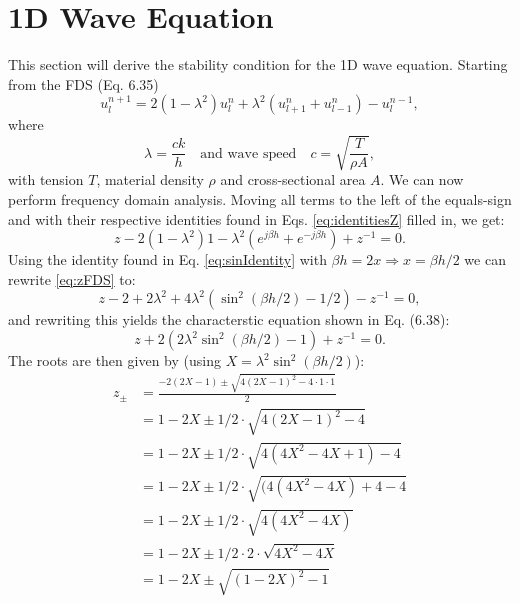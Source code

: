 \documentclass{article}
\begin{document}
\section{1D Wave Equation}
This section will derive the stability condition for the 1D wave equation. Starting from the FDS (Eq. 6.35)
\begin{equation}
    u_l^{n+1} = 2(1-\lambda^2)u_l^n + \lambda^2(u_{l+1}^n+u_{l-1}^n)-u_l^{n-1},
\end{equation}
where
\begin{equation}\label{eq:lambda}
    \lambda = \frac{ck}{h} \quad \text{and wave speed} \quad c = \sqrt{\frac{T}{\rho A}},
\end{equation}
with tension $T$, material density $\rho$ and cross-sectional area $A$.
We can now perform frequency domain analysis. Moving all terms to the left of the equals-sign and with their respective identities found in Eqs. \eqref{eq:identitiesZ} filled in, we get:
\begin{equation}\label{eq:zFDS}
    z - 2(1-\lambda^2)1 - \lambda^2(e^{j\beta h}+e^{-j\beta h}) + z^{-1} = 0.
\end{equation}
Using the identity found in Eq. \eqref{eq:sinIdentity} with $\beta h = 2x \Rightarrow x = \beta h / 2$ we can rewrite \eqref{eq:zFDS} to:
\begin{equation}
     z - 2 + 2\lambda^2 +4\lambda^2(\sin^2({\beta h / 2}) - 1/2) - z^{-1} = 0,
\end{equation}
and rewriting this yields the characterstic equation shown in Eq. (6.38):
\begin{equation}\label{eq:characteristic1D}
     z + 2(2\lambda^2\sin^2(\beta h/2) - 1) + z^{-1} = 0.
\end{equation}
The roots are then given by (using $X = \lambda^2\sin^2(\beta h/2)$):
\begin{equation}
\begin{aligned}\nonumber
    z_\pm &= \frac{-2(2X-1) \pm \sqrt{4(2X-1)^2 - 4 \cdot 1 \cdot 1}}{2}\\
    &= 1-2X \pm 1/2 \cdot \sqrt{4(2X-1)^2 - 4}\\
    &= 1-2X \pm 1/2 \cdot \sqrt{4(4X^2-4X + 1) - 4}\\
    &= 1-2X \pm 1/2 \cdot \sqrt{(4(4X^2 - 4X) + 4 - 4}\\
    &= 1-2X \pm 1/2 \cdot \sqrt{4(4X^2 - 4X)}\\
    &= 1-2X \pm 1/2 \cdot 2 \cdot \sqrt{4X^2 - 4X}\\
    &= 1-2X \pm \sqrt{(1 - 2X)^2 - 1}\\
\end{aligned}
\end{equation}
\end{document}
